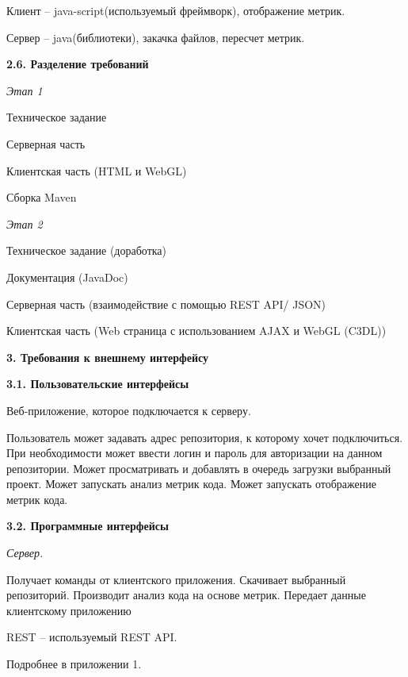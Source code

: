 \documentclass[a4paper,12pt]{article}
\begin{document}
		Клиент – java-script(используемый фреймворк), отображение метрик.
		
		Сервер – java(библиотеки), закачка файлов, пересчет метрик.
		\newline
		
	\textbf{2.6. Разделение требований}
	
		\textit{Этап 1}
		
		Техническое задание
                    
                Серверная часть
		
		Клиентская часть (HTML и WebGL) 
                
                Сборка Maven
		
                \textit{Этап 2}
		
		Техническое задание (доработка)

                Документация (JavaDoc)
                    
                Серверная часть (взаимодействие с помощью REST API/ JSON)
		
		Клиентская часть (Web страница с использованием AJAX и WebGL (C3DL)) 
                
\maketitle
\newpage
\textbf{3. Требования к внешнему интерфейсу}
\newline

	\textbf{3.1. Пользовательские интерфейсы}
	
	Веб-приложение, которое подключается к серверу.
	
	Пользователь может задавать адрес репозитория, к которому хочет подключиться. При необходимости может ввести логин и пароль для авторизации на данном репозитории. Может просматривать и добавлять в очередь загрузки выбранный проект. Может запускать анализ метрик кода. Может запускать отображение метрик кода.
        \newline
	
	\textbf{3.2. Программные интерфейсы}
	
		\textit{Сервер.}
		
		Получает команды от клиентского приложения. Скачивает выбранный репозиторий. Производит анализ кода на основе метрик. Передает данные клиентскому приложению
		
		REST – используемый REST API.
                
                Подробнее в приложении 1.
		
\end{document}
